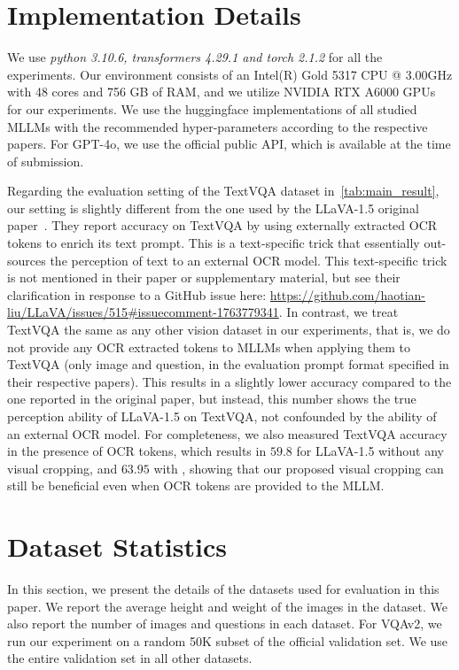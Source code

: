\section{Implementation Details}
\label{app:imp}
We use \textit{python 3.10.6, transformers 4.29.1 and torch 2.1.2} for all the experiments. Our environment consists of an Intel(R) Gold 5317 CPU @ 3.00GHz with 48 cores and 756 GB of RAM, and we utilize NVIDIA RTX A6000 GPUs for our experiments. We use the huggingface implementations of all studied MLLMs with the recommended hyper-parameters according to the respective papers. For GPT-4o, we use the official public API, which is available at the time of submission.

Regarding the evaluation setting of the TextVQA dataset in~\cref{tab:main_result}, our setting is slightly different from the one used by the LLaVA-1.5 original paper~\cite{llava1.5}. They report accuracy on TextVQA by using externally extracted OCR tokens to enrich its text prompt. This is a text-specific trick that essentially out-sources the perception of text to an external OCR model. This text-specific trick is not mentioned in their paper or supplementary material, but see their clarification in response to a GitHub issue here: \url{https://github.com/haotian-liu/LLaVA/issues/515#issuecomment-1763779341}. In contrast, we treat TextVQA the same as any other vision dataset in our experiments, that is, we do not provide any OCR extracted tokens to MLLMs when applying them to TextVQA (only image and question, in the evaluation prompt format specified in their respective papers). This results in a slightly lower accuracy compared to the one reported in the original paper, but instead, this number shows the true perception ability of LLaVA-1.5 on TextVQA, not confounded by the ability of an external OCR model. For completeness, we also measured TextVQA accuracy in the presence of OCR tokens, which results in $59.8$ for LLaVA-1.5 without any visual cropping, and $63.95$ with \rel{}, showing that our proposed visual cropping can still be beneficial even when OCR tokens are provided to the MLLM.


\section{Dataset Statistics}
\label{app:dataset}
In this section, we present the details of the datasets used for evaluation in this paper. We report the average height and weight of the images in the dataset. We also report the number of images and questions in each dataset. For VQAv2, we run our experiment on a random 50K subset of the official validation set. We use the entire validation set in all other datasets.


